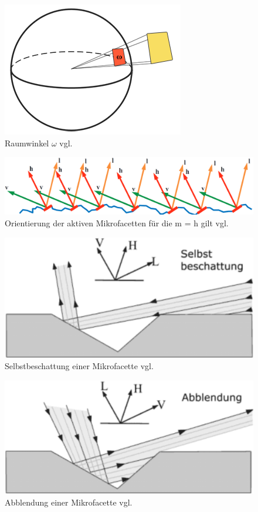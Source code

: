 \documentclass[
  11pt,
  a4paper,
  oneside
  ]{article}
\begin{document}
\begin{figure}[H]
  \centering
  \includegraphics*[width=0.9 \textwidth]{images/solid_angle.png}
  \caption{Raumwinkel $\omega$ vgl. \cite{learnOpenGL}}
  \label{fig:img6}
\end{figure}
\begin{figure}[H]
  \centering
  \includegraphics*[width=0.9 \textwidth]{images/normalDistriFun.png}
  \caption{Orientierung der aktiven Mikrofacetten für die m = h gilt vgl. \cite{learnOpenGL}}
  \label{fig:img7}
\end{figure}
\begin{figure}[H]
  \centering
  \includegraphics*[width=0.45 \textwidth]{images/selstbeschattung.png}
  \caption{Selbstbeschattung einer Mikrofacette vgl. \cite{learnOpenGL}}
  \label{fig:img8}
\end{figure}
\begin{figure}[H]
  \centering
  \includegraphics*[width=0.45 \textwidth]{images/abblendung.png}
  \caption{Abblendung einer Mikrofacette vgl. \cite{learnOpenGL}}
  \label{fig:img9}
\end{figure}
\end{document}
